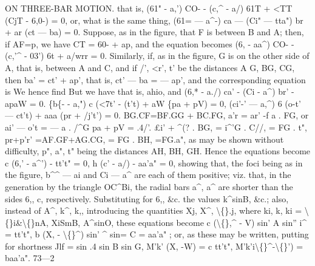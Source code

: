 \documentclass[11pt,a4paper]{book}
\begin{document}
ON THREE-BAR MOTION.
that
is,
(61" - a,') CO- - (c,\textasciicircum{} - a/) 61T + <TT (CjT - 6,0-) = 0,
or, what
is the same
thing,
(61= --- a\textasciicircum{}-) ca --- (Ci" --- tta") br + ar (ct --- ba) = 0.
Suppose,
as
in
the
figure,
that F
is
between B
and A;
then,
if AF=p, we
have CT = 60- + ap, and the equation becomes
(6,\guillemotleft{} - aa\textasciicircum{}) CO- - (c,'\textasciicircum{} - 03') 6t + a/wrr = 0.
Similarly,
if,
as
in
the
figure, G
is
on
the
other
side
of
A,
that
is,
between A
and
C,
and
if
/\guillemotright{}',
<r',
t'
be
the
distances A G, BG,
CG,
then
ba' = ct' + ap',
that
is,
ct' --- ba = --- ap', and
the corresponding equation
is
We hence
find
But we have
that
is,
ahio,
and
(6,* - a./) ca' - (Ci\guillemotright{} - a\textasciicircum{}) br' - apaW = 0.
\{b\{- - a,") c (<7t' - (t't) + aW \{pa + pV) = 0,
(ci'-' --- a,\textasciicircum{}) 6 (o-t' --- ct't) + aaa (pr + /j't') = 0.
BG.CF=BF.GG + BC.FG,
a'r = ar'
-f a
. FG,
or
ai' --- o't = --- a
. /\textasciicircum{}G
pa + pV = .4/'. \pounds{}i' + \textasciicircum{}(?
. BG, = i\textasciicircum{}'G
. C//, = FG
. t",
pr+p'r' =AF.GF+AG.CG, = FG
. BH, =FG.a",
as
may
be
shown
without
difficulty,
p",
a",
t"
being
the
distances AH, BH,
GH.
Hence the equations become
c (6,' - a\textasciicircum{}') - tt't" = 0,
h (c' - a/) - aa'a" = 0,
showing
that,
the
foci
being
as
in
the
figure,
b\textasciicircum{}\textasciicircum{} --- ai
and
Ci\textdegree{} --- a\textasciicircum{}
are
each
of them
positive;
viz.
that,
in
the
generation
by the
triangle
OC\textasciicircum{}Bi, the
radial
bars
a\textasciicircum{},
a\textasciicircum{} are
shorter than the
sides
6,,
c,
respectively.
Substituting
for
6,, \&c. the values k\textasciicircum{}sinB, \&c.;
also, instead of A\textasciicircum{},
k\textasciicircum{},
k,, introducing the quantities
Xj,
X\textasciicircum{},
\textbackslash\{\}.j, where
ki,
k\guillemotleft{},
ki = \textbackslash\{\}i\&\textbackslash\{\}nA, XiSmB, A\textasciicircum{}sinO,
these equations become
c (\textbackslash\{\},\textasciicircum{} - V) sin' A sin'' i\textasciicircum{} = tt't",
b (X,\guillemotright{} - \textbackslash\{\}\textasciicircum{}) sin' \textasciicircum{} sin= C = aa'a"
;
or, as these may be
written, putting
for shortness
Jlf = sin .4 sin B sin G,
M'k' (X,\guillemotright{} -W) = c tt't",
M'k'i\textbackslash\{\}\textasciicircum{}-\textbackslash\{\}') = baa'a".
73---2
\end{document}
